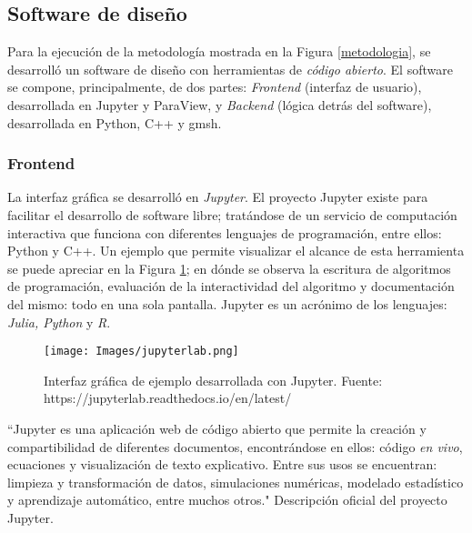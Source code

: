\subsection{Software de dise\~no}

\noindent
\justify

Para la ejecuci\'on de la metodolog\'ia mostrada en la Figura \ref{metodologia}, se desarroll\'o un software de dise\~no con herramientas de \textit{c\'odigo abierto}. El software se compone, principalmente, de dos partes: \textit{Frontend} (interfaz de usuario), desarrollada en Jupyter y ParaView, y \textit{Backend} (l\'ogica detr\'as del software), desarrollada en Python, C++ y gmsh. 

\subsubsection{Frontend}

\noindent
\justify

La interfaz gr\'afica se desarroll\'o en \textit{Jupyter}. El proyecto Jupyter existe para facilitar el desarrollo de software libre; trat\'andose de un servicio de computaci\'on interactiva que funciona con diferentes lenguajes de programaci\'on, entre ellos: Python y C++. Un ejemplo que permite visualizar el alcance de esta herramienta se puede apreciar en la Figura \ref{jupyter}; en d\'onde se observa la escritura de algoritmos de programaci\'on, evaluaci\'on de la interactividad del algoritmo y documentaci\'on del mismo: todo en una sola pantalla. Jupyter es un acr\'onimo de los lenguajes: \textit{Julia, Python} y \textit{R}.

\begin{figure}[h!]
	\centering
	\texttt{[image: Images/jupyterlab.png]}
	\caption{Interfaz gr\'afica de ejemplo desarrollada con Jupyter. Fuente: https://jupyterlab.readthedocs.io/en/latest/}
	\label{jupyter}
\end{figure}

\noindent
\justify

``Jupyter es una aplicaci\'on web de c\'odigo abierto que permite la creaci\'on y compartibilidad de diferentes documentos, encontr\'andose en ellos: c\'odigo \textit{en vivo}, ecuaciones y visualizaci\'on de texto explicativo. Entre sus usos se encuentran: limpieza y transformaci\'on de datos, simulaciones num\'ericas, modelado estad\'istico y aprendizaje autom\'atico, entre muchos otros." Descripci\'on oficial del proyecto Jupyter.

\noindent
\justify

